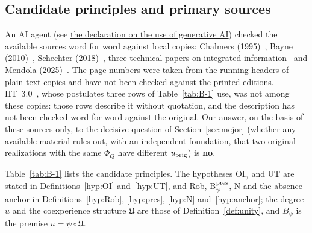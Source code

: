 \subsection{Candidate principles and primary sources}\label{sec:principios}
An AI agent (see \hyperref[sec:ai]{the declaration on the use of generative AI}) checked the available sources word for word against local copies: Chalmers (1995)~\cite{Chalmers1995}, Bayne (2010)~\cite{Bayne2010}, Schechter (2018)~\cite{Schechter2018}, three technical papers on integrated information~\cite{Kitazono2018,Oizumi2016PNAS,TokerSommer2019} and Mendola (2025)~\cite{Mendola2025}. The page numbers were taken from the running headers of plain-text copies and have not been checked against the printed editions. IIT~3.0~\cite{Oizumi2014}, whose postulates three rows of Table~\ref{tab:B-1} use, was not among these copies: those rows describe it without quotation, and the description has not been checked word for word against the original. Our answer, on the basis of these sources only, to the decisive question of Section~\ref{sec:mejor} (whether any available material rules out, with an independent foundation, that two original realizations with the same $\Phi_Q$ have different $u_{\rm orig}$) is \textbf{no}.

Table~\ref{tab:B-1} lists the candidate principles. The hypotheses OI$_\gamma$ and UT are stated in Definitions~\ref{hyp:OI} and~\ref{hyp:UT}, and Rob, B$_\psi^{\rm pres}$, N and the absence anchor in Definitions~\ref{hyp:Rob}, \ref{hyp:pres}, \ref{hyp:N} and~\ref{hyp:anchor}; the degree $u$ and the coexperience structure $\mathfrak U$ are those of Definition~\ref{def:unity}, and $B_\psi$ is the premise $u=\psi\circ\mathfrak U$.

